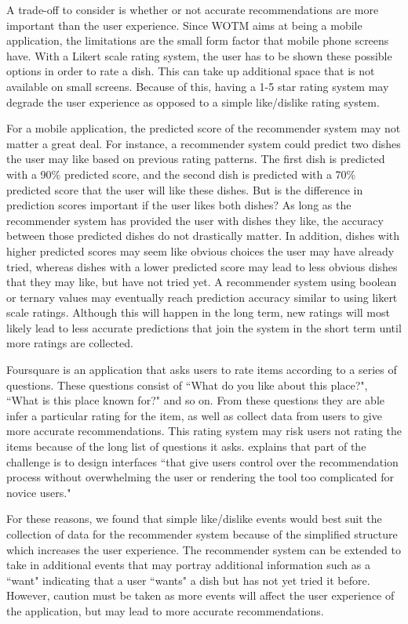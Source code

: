 A trade-off to consider is whether or not accurate recommendations are more important than the user experience. Since WOTM aims at being a mobile application, the limitations are the small form factor that mobile phone screens have. With a Likert scale rating system, the user has to be shown these possible options in order to rate a dish. This can take up additional space that is not available on small screens. Because of this, having a 1-5 star rating system may degrade the user experience as opposed to a simple like/dislike rating system. 

For a mobile application, the predicted score of the recommender system may not matter a great deal. For instance, a recommender system could predict two dishes the user may like based on previous rating patterns. The first dish is predicted with a 90\% predicted score, and the second dish is predicted with a 70\% predicted score that the user will like these dishes. But is the difference in prediction scores important if the user likes both dishes? As long as the recommender system has provided the user with dishes they like, the accuracy between those predicted dishes do not drastically matter. In addition, dishes with higher predicted scores may seem like obvious choices the user may have already tried, whereas dishes with a lower predicted score may lead to less obvious dishes that they may like, but have not tried yet. A recommender system using boolean or ternary values may eventually reach prediction accuracy similar to using likert scale ratings. Although this will happen in the long term, new ratings will most likely lead to less accurate predictions that join the system in the short term until more ratings are collected. 

Foursquare is an application that asks users to rate items according to a series of questions. These questions consist of ``What do you like about this place?", ``What is this place known for?" and so on. From these questions they are able infer a particular rating for the item, as well as collect data from users to give more accurate recommendations. This rating system may risk users not rating the items because of the long list of questions it asks. \cite{martin2009recsys} explains that part of the challenge is to design interfaces ``that give users control over the recommendation process without overwhelming the user or rendering the tool too complicated for novice users." 

For these reasons, we found that simple like/dislike events would best suit the collection of data for the recommender system because of the simplified structure which increases the user experience. The recommender system can be extended to take in additional events that may portray additional information such as a ``want" indicating that a user ``wants" a dish but has not yet tried it before. However, caution must be taken as more events will affect the user experience of the application, but may lead to more accurate recommendations. 

